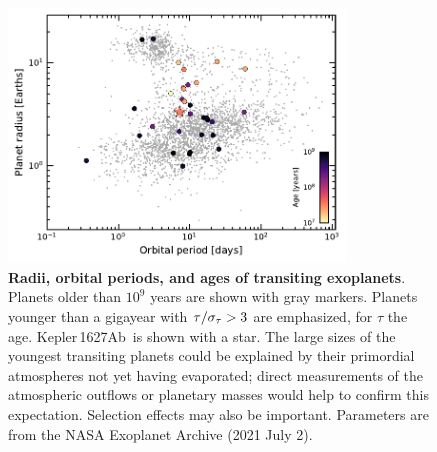 \documentclass[12pt,modern,twocolumn,tighten]{aastex63}
\newcommand{\pn}{Kepler\,1627Ab} %
\begin{document}
\begin{figure}[tp]
	\begin{center}
		\leavevmode
		\includegraphics[width=0.8\textwidth]{f14.pdf}
	\end{center}
	\vspace{-0.7cm}
	\caption{
		{\bf Radii, orbital periods, and ages of transiting
			exoplanets}.  Planets older than $10^9$ years are shown with gray
		markers.  Planets younger than a gigayear with ${\rm
			\tau}/\sigma_{\rm \tau} > 3$ are emphasized, for $\tau$ the age.
		\pn\ is shown with a
		star.  The large sizes of the youngest transiting planets could be
		explained by their primordial atmospheres not yet having
		evaporated; direct measurements of the atmospheric outflows or
		planetary masses would help to confirm this expectation.
		Selection effects may also be important.  Parameters are from the
		NASA Exoplanet Archive (2021 July 2).
		\label{fig:rp_period_age}
	}
\end{figure}


\end{document}
